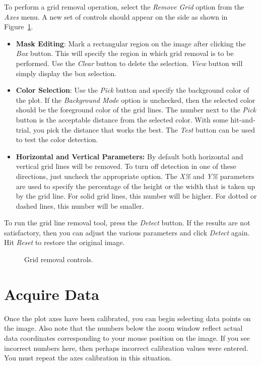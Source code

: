 \documentclass[letterpaper, 11pt]{article}
\begin{document}
To perform a grid removal operation, select the \emph{Remove Grid} option from the \emph{Axes} menu. A new set of controls should appear on the side as shown in Figure~\ref{fig:gridRemoval}.

\begin{itemize}
\item{{\bf Mask Editing}: Mark a rectangular region on the image after clicking the \emph{Box} button. This will specify the region in which grid removal is to be performed. Use the \emph{Clear} button to delete the selection. \emph{View} button will simply display the box selection.}
\item{{\bf Color Selection}: Use the \emph{Pick} button and specify the background color of the plot. If the \emph{Background Mode} option is unchecked, then the selected color should be the foreground color of the grid lines. The number next to the \emph{Pick} button is the acceptable distance from the selected color. With some hit-and-trial, you pick the distance that works the best. The \emph{Test} button can be used to test the color detection.}
\item{{\bf Horizontal and Vertical Parameters:} By default both horizontal and vertical grid lines will be removed. To turn off detection in one of these directions, just uncheck the appropriate option. The \emph{X\%} and \emph{Y\%} parameters are used to specify the percentage of the height or the width that is taken up by the grid line. For solid grid lines, this number will be higher. For dotted or dashed lines, this number will be smaller.}
\end{itemize}

To run the grid line removal tool, press the \emph{Detect} button. If the results are not satisfactory, then you can adjust the various parameters and click \emph{Detect} again. Hit \emph{Reset} to restore the original image.

\begin{figure}
\begin{center}
\caption{Grid removal controls.}
\label{fig:gridRemoval}
\end{center}
\end{figure}

\section{Acquire Data}

Once the plot axes have been calibrated, you can begin selecting data points on the image. Also note that the numbers below the zoom window reflect actual data coordinates corresponding to your mouse position on the image. If you see incorrect numbers here, then perhaps incorrect calibration values were entered. You must repeat the axes calibration in this situation. 
\end{document}
